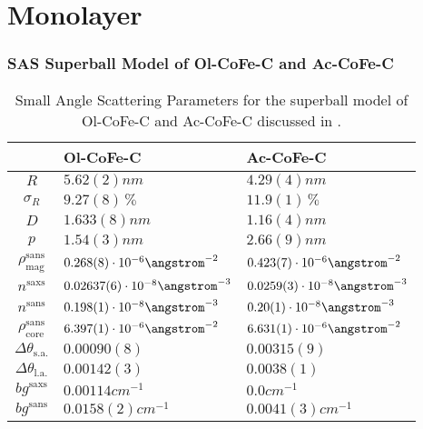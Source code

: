 \documentclass[\main/dresen_thesis.tex]{subfiles}
\begin{document}
\section{Monolayer}
\subsubsection{SAS Superball Model of Ol-CoFe-C and Ac-CoFe-C}\label{ch:appendix:modelparameters:monolayers:sas_olac_cofe_c}
  \begin{table}[ht]
    \centering
    \caption{\label{tab:appendix:modelparamters:monolayers:nanoparticle:sas}Small Angle Scattering Parameters for the superball model of Ol-CoFe-C and Ac-CoFe-C discussed in .}
    \begin{tabular}{ c | l | l }
        & Ol-CoFe-C & Ac-CoFe-C \\
      \hline
      $R$
        & $5.62(2) \unit{nm}$
        & $4.29(4) \unit{nm}$\\
      $\sigma_R$
        & $9.27(8) \,\%$
        & $11.9(1) \,\%$\\
      $D$
        & $1.633(8) \unit{nm}$
        & $1.16(4) \unit{nm}$\\
      $p$
        & $1.54(3) \unit{nm}$
        & $2.66(9) \unit{nm}$\\
      $\rho_\mathrm{mag}^\mathrm{sans}$
        & $0.268(8) \cdot 10^{-6} \angstrom^{-2}$
        & $0.423(7) \cdot 10^{-6} \angstrom^{-2}$\\
      \hline
      $n^\mathrm{saxs}$
        & $0.02637(6) \cdot 10^{-8} \angstrom^{-3}$
        & $0.0259(3) \cdot 10^{-8} \angstrom^{-3}$\\
      $n^\mathrm{sans}$
        & $0.198(1) \cdot 10^{-8} \angstrom^{-3}$
        & $0.20(1) \cdot 10^{-8} \angstrom^{-3}$\\
      $\rho_\mathrm{core}^\mathrm{sans}$
        & $6.397(1) \cdot 10^{-6} \angstrom^{-2}$
        & $6.631(1) \cdot 10^{-6} \angstrom^{-2}$\\
      $\Delta \theta_\mathrm{s. a.}$
        & $0.00090(8)$
        & $0.00315(9)$\\
      $\Delta \theta_\mathrm{l. a.}$
        & $0.00142(3)$
        & $0.0038(1)$\\
      $bg^\mathrm{saxs}$
        & $0.00114 \unit{cm}^{-1}$
        & $0.0 \unit{cm}^{-1}$\\
      $bg^\mathrm{sans}$
        & $0.0158(2) \unit{cm}^{-1}$
        & $0.0041(3) \unit{cm}^{-1}$\\

\end{tabular}
\end{table}
\end{document}
